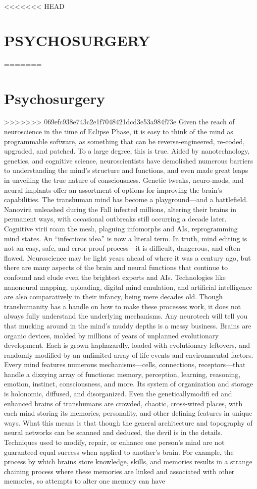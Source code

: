 <<<<<<< HEAD \section{PSYCHOSURGERY} ======= \section{Psychosurgery} >>>>>>> 069efc938e743c2e1f7048421dcd3e53a984f73e Given the reach of neuroscience in the time of Eclipse Phase, it is easy to think of the mind as programmable software, as something that can be reverse-engineered, re-coded, upgraded, and patched. To a large degree, this is true. Aided by nanotechnology, genetics, and cognitive science, neuroscientists have demolished numerous barriers to understanding the mind’s structure and functions, and even made great leaps in unveiling the true nature of consciousness. Genetic tweaks, neuro-mods, and neural implants offer an assortment of options for improving the brain’s capabilities. The transhuman mind has become a playground—and a battlefield. Nanovirii unleashed during the Fall infected millions, altering their brains in permanent ways, with occasional outbreaks still occurring a decade later. Cognitive virii roam the mesh, plaguing infomorphs and AIs, reprogramming mind states. An “infectious idea” is now a literal term. In truth, mind editing is not an easy, safe, and error-proof process—it is difficult, dangerous, and often flawed. Neuroscience may be light years ahead of where it was a century ago, but there are many aspects of the brain and neural functions that continue to confound and elude even the brightest experts and AIs. Technologies like nanoneural mapping, uploading, digital mind emulation, and artificial intelligence are also comparatively in their infancy, being mere decades old. Though transhumanity has a handle on how to make these processes work, it does not always fully understand the underlying mechanisms. Any neurotech will tell you that mucking around in the mind’s muddy depths is a messy business. Brains are organic devices, molded by millions of years of unplanned evolutionary development. Each is grown haphazardly, loaded with evolutionary leftovers, and randomly modified by an unlimited array of life events and environmental factors. Every mind features numerous mechanisms—cells, connections, receptors—that handle a dizzying array of functions: memory, perception, learning, reasoning, emotion, instinct, consciousness, and more. Its system of organization and storage is holonomic, diffused, and disorganized. Even the geneticallymodifi ed and enhanced brains of transhumans are crowded, chaotic, cross-wired places, with each mind storing its memories, personality, and other defining features in unique ways. What this means is that though the general architecture and topography of neural networks can be scanned and deduced, the devil is in the details. Techniques used to modify, repair, or enhance one person’s mind are not guaranteed equal success when applied to another’s brain. For example, the process by which brains store knowledge, skills, and memories results in a strange chaining process where these memories are linked and associated with other memories, so attempts to alter one memory can have 